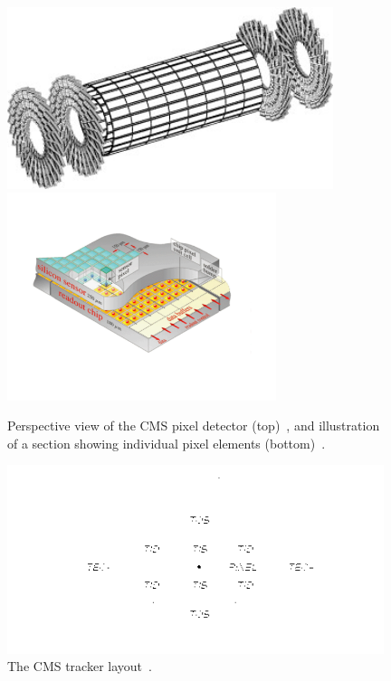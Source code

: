 \begin{figure}
  \begin{center}
  \captionsetup{width=.8\textwidth,justification=centering}
  \includegraphics[width=0.85\textwidth,keepaspectratio]{plots_and_figures/chapter3/pixeldet.jpg}
  \\
  \includegraphics[width=0.7\textwidth,keepaspectratio]{plots_and_figures/chapter3/pixelelem.pdf}
\caption{Perspective view of the CMS pixel detector (top)~\cite{pix_det}, and illustration of a section showing individual pixel elements (bottom)~\cite{pix_elem}.}
\label{fig:pix_det}
\end{center}
\end{figure}


\begin{figure}
\begin{center}
  \captionsetup{justification=centering}
  \includegraphics[width=0.98\textwidth,keepaspectratio]{plots_and_figures/chapter3/trackerlayout.png}
\caption{The CMS tracker layout~\cite{cms_exp_ref}.}
\label{fig:tracker_layout}
\end{center}
\end{figure}

